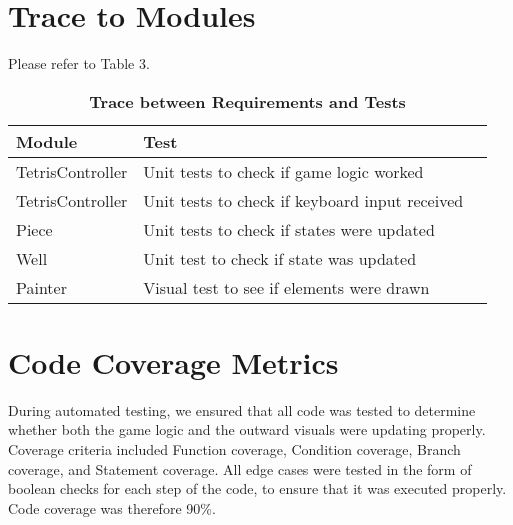 \documentclass[12pt, titlepage]{article}
\begin{document}
\section{Trace to Modules}
Please refer to Table 3.

\begin{table}[bp]
\caption{\bf Trace between Requirements and Tests}
\begin{tabularx}{\textwidth}{p{5cm}p{15cm}X}
\toprule {\bf Module} & {\bf Test}\\
\midrule
TetrisController & Unit tests to check if game logic worked\\
TetrisController & Unit tests to check if keyboard input received\\
Piece & Unit tests to check if states were updated\\
Well & Unit test to check if state was updated\\
Painter & Visual test to see if elements were drawn\\
\bottomrule
\end{tabularx}
\end{table}

\section{Code Coverage Metrics}
During automated testing, we ensured that all code was tested to determine whether both the game logic and the outward visuals were updating properly. Coverage criteria included Function coverage, Condition coverage, Branch coverage, and Statement coverage. All edge cases were tested in the form of boolean checks for each step of the code, to ensure that it was executed properly. Code coverage was therefore 90\%. 


\end{document}
